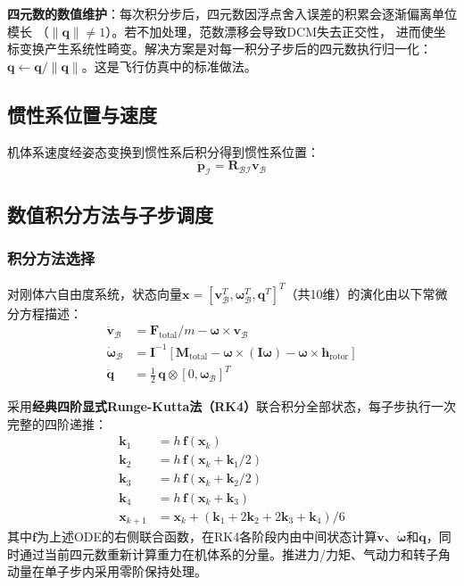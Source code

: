 \textbf{四元数的数值维护}：每次积分步后，四元数因浮点舍入误差的积累会逐渐偏离单位模长
（$\|\bm{q}\| \neq 1$）。若不加处理，范数漂移会导致DCM失去正交性，
进而使坐标变换产生系统性畸变。解决方案是对每一积分子步后的四元数执行归一化：
$\bm{q} \leftarrow \bm{q} / \|\bm{q}\|$。这是飞行仿真中的标准做法。

\subsection{惯性系位置与速度}

机体系速度经姿态变换到惯性系后积分得到惯性系位置：
\begin{equation}
    \dot{\bm{p}}_{\mathcal{I}} = \bm{R}_{\mathcal{B}\mathcal{I}} \bm{v}_{\mathcal{B}}
    \label{eq:position_integration}
\end{equation}

\subsection{数值积分方法与子步调度}

\subsubsection{积分方法选择}

对刚体六自由度系统，状态向量$\mathbf{x}=[\mathbf{v}_{\mathcal{B}}^T,\boldsymbol{\omega}_{\mathcal{B}}^T,\mathbf{q}^T]^T$（共10维）的演化由以下常微分方程描述：
\begin{align}
    \dot{\mathbf{v}}_{\mathcal{B}} &= \mathbf{F}_{\text{total}}/m - \boldsymbol{\omega}\times\mathbf{v}_{\mathcal{B}} \\
    \dot{\boldsymbol{\omega}}_{\mathcal{B}} &= \mathbf{I}^{-1}\left[\mathbf{M}_{\text{total}} - \boldsymbol{\omega}\times(\mathbf{I}\boldsymbol{\omega}) - \boldsymbol{\omega}\times\mathbf{h}_{\text{rotor}}\right] \\
    \dot{\mathbf{q}} &= \frac{1}{2}\,\mathbf{q}\otimes[0,\boldsymbol{\omega}_{\mathcal{B}}]^T
\end{align}

采用\textbf{经典四阶显式Runge-Kutta法（RK4）}联合积分全部状态，每子步执行一次完整的四阶递推：
\begin{equation}
    \begin{aligned}
        \mathbf{k}_1 &= h\,\mathbf{f}(\mathbf{x}_k) \\
        \mathbf{k}_2 &= h\,\mathbf{f}(\mathbf{x}_k + \mathbf{k}_1/2) \\
        \mathbf{k}_3 &= h\,\mathbf{f}(\mathbf{x}_k + \mathbf{k}_2/2) \\
        \mathbf{k}_4 &= h\,\mathbf{f}(\mathbf{x}_k + \mathbf{k}_3) \\
        \mathbf{x}_{k+1} &= \mathbf{x}_k + (\mathbf{k}_1 + 2\mathbf{k}_2 + 2\mathbf{k}_3 + \mathbf{k}_4)/6
    \end{aligned}
    \label{eq:rk4}
\end{equation}
其中$\mathbf{f}$为上述ODE的右侧联合函数，在RK4各阶段内由中间状态计算$\dot{\mathbf{v}}$、$\dot{\boldsymbol{\omega}}$和$\dot{\mathbf{q}}$，同时通过当前四元数重新计算重力在机体系的分量。推进力/力矩、气动力和转子角动量在单子步内采用零阶保持处理。

